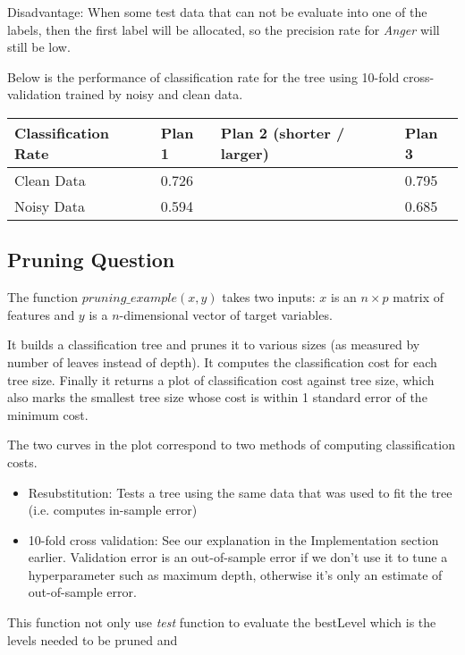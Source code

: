 \documentclass[12pt, a4paper]{article}
\begin{document}
Disadvantage: When some test data that can not be evaluate into one of the labels, then the first label will be allocated, so the precision rate for \textit{Anger} will still be low.\par
\bigskip
Below is the performance of classification rate for the tree using 10-fold cross-validation trained by noisy and clean data.
\begin{center}
\begin{tabular} { C{4cm} | C{1.5cm} C{3cm} C{1.5cm} }
    Classification Rate & Plan 1 & Plan 2 (shorter / larger) & Plan 3 \\ \hline
    Clean Data     &0.726   &  & 0.795 \\
    Noisy Data   &0.594   &  &  0.685  \\
\end{tabular}
\label{table}
\end{center}
\bigskip

\subsection*{Pruning Question}
The function $pruning\_example(x, y)$ takes two inputs: $x$ is an $n \times p$ matrix of features and $y$ is a $n$-dimensional vector of target variables.\par
\bigskip
It builds a classification tree and prunes it to various sizes (as measured by number of leaves instead of depth). It computes the classification cost for each tree size. Finally it returns a plot of classification cost against tree size, which also marks the smallest tree size whose cost is within 1 standard error of the minimum cost.\par
\bigskip
The two curves in the plot correspond to two methods of computing classification costs.
\begin{itemize}
    \item Resubstitution: Tests a tree using the same data that was used to fit the tree (i.e. computes in-sample error)
    \item 10-fold cross validation: See our explanation in the Implementation section earlier. Validation error is an out-of-sample error if we don't use it to tune a hyperparameter such as maximum depth, otherwise it's only an estimate of out-of-sample error.
\end{itemize}

This function not only use \textit{test} function to evaluate the bestLevel which is the levels needed to be pruned and 
\end{document}
